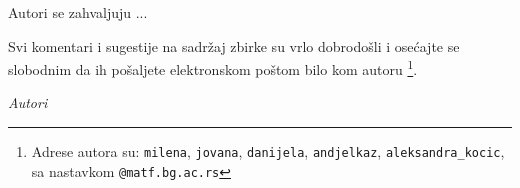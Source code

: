 Autori se zahvaljuju ...

Svi komentari i sugestije na sadržaj zbirke su vrlo dobrodošli i osećajte se slobodnim da ih pošaljete elektronskom poštom bilo kom autoru \footnote{Adrese autora su: \texttt{milena}, \texttt{jovana}, \texttt{danijela}, \texttt{andjelkaz}, \texttt{aleksandra\_kocic}, sa nastavkom \texttt{@matf.bg.ac.rs}}. 


\bigskip


\bigskip

\begin{flushright}
{\em Autori}
\end{flushright}